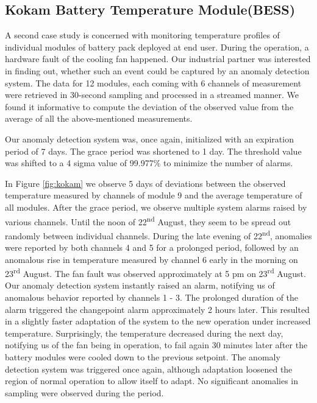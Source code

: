 \subsection{Kokam Battery Temperature Module(BESS)}\label{AA:Kokam}
A second case study is concerned with monitoring temperature profiles of individual modules of battery pack deployed at end user. During the operation, a hardware fault of the cooling fan happened. Our industrial partner was interested in finding out, whether such an event could be captured by an anomaly detection system. The data for 12 modules, each coming with 6 channels of measurement were retrieved in 30-second sampling and processed in a streamed manner. We found it informative to compute the deviation of the observed value from the average of all the above-mentioned measurements.

Our anomaly detection system was, once again, initialized with an expiration period of 7 days. The grace period was shortened to 1 day. The threshold value was shifted to a 4 sigma value of 99.977\% to minimize the number of alarms.

In Figure \ref{fig:kokam} we observe 5 days of deviations between the observed temperature measured by channels of module 9 and the average temperature of all modules. After the grace period, we observe multiple system alarms raised by various channels. Until the noon of 22\textsuperscript{nd} August, they seem to be spread out randomly between individual channels. During the late evening of 22\textsuperscript{nd}, anomalies were reported by both channels 4 and 5 for a prolonged period, followed by an anomalous rise in temperature measured by channel 6 early in the morning on 23\textsuperscript{rd} August. The fan fault was observed approximately at 5 pm on 23\textsuperscript{rd} August. Our anomaly detection system instantly raised an alarm, notifying us of anomalous behavior reported by channels 1 - 3. The prolonged duration of the alarm triggered the changepoint alarm approximately 2 hours later. This resulted in a slightly faster adaptation of the system to the new operation under increased temperature. Surprisingly, the temperature decreased during the next day, notifying us of the fan being in operation, to fail again 30 minutes later after the battery modules were cooled down to the previous setpoint. The anomaly detection system was triggered once again, although adaptation loosened the region of normal operation to allow itself to adapt. No significant anomalies in sampling were observed during the period.

